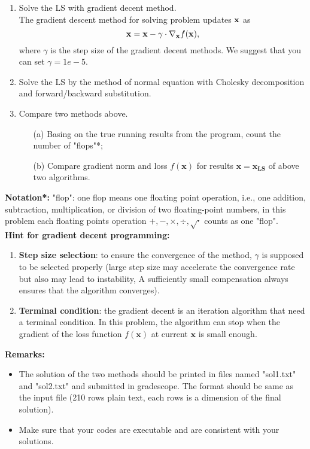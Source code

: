 \documentclass[english,onecolumn]{IEEEtran}
\begin{document}
\begin{enumerate}
    \item Solve the LS with gradient decent method.\\
    The gradient descent method for solving problem updates $ {\bf x}$ as
    $$
        {\bf x} = {\bf x} - \gamma \cdot \nabla_{{\bf x}} f(\mathbf{x}),
    $$
    where $\gamma$ is the step size of the gradient decent methods. We suggest that you can set $\gamma=1e-5$.
    \item Solve the LS by the method of normal equation with Cholesky decomposition and forward/backward substitution.
    \item Compare two methods above. 
    \begin{enumerate}
        \item[(a)] Basing on the true running results from the program, count the number of "flops"*;
        \item[(b)] Compare gradient norm and loss $f(\mathbf{x})$ for results $\mathbf{x}=\mathbf{x_{LS}}$ of above two algorithms.
    \end{enumerate}
\end{enumerate}
    \textbf{Notation*:} "flop": one flop means one floating point operation, i.e., one addition, subtraction, multiplication, or division of two floating-point numbers, in this problem each floating points operation $+,-,\times, \div, \sqrt{\cdot}$ counts as one "flop". \\
    \textbf{Hint for gradient decent programming:} 
    \begin{enumerate}
        \item \textbf{Step size selection}: to ensure the convergence of the method, $\gamma$ is supposed to be selected properly (large step size may accelerate the convergence rate but also may lead to instability, A sufficiently small compensation always ensures that the algorithm converges). 
        \item \textbf{Terminal condition}: the gradient decent is an iteration algorithm that need a terminal condition. In this problem, the algorithm can stop when the gradient of the loss function $f(\mathbf{x})$ at current $\mathbf{x}$ is small enough.
    \end{enumerate}
    \noindent\textbf{Remarks: }
   \begin{itemize}
    \item The solution of the two methods should be printed in files named "sol1.txt" and "sol2.txt" and submitted in gradescope.  The format should be same as the input file (210 rows plain text, each rows is a dimension of the final solution).
    \item Make sure that your codes are executable and are consistent with your solutions.
   \end{itemize}
\noindent
\end{document}
